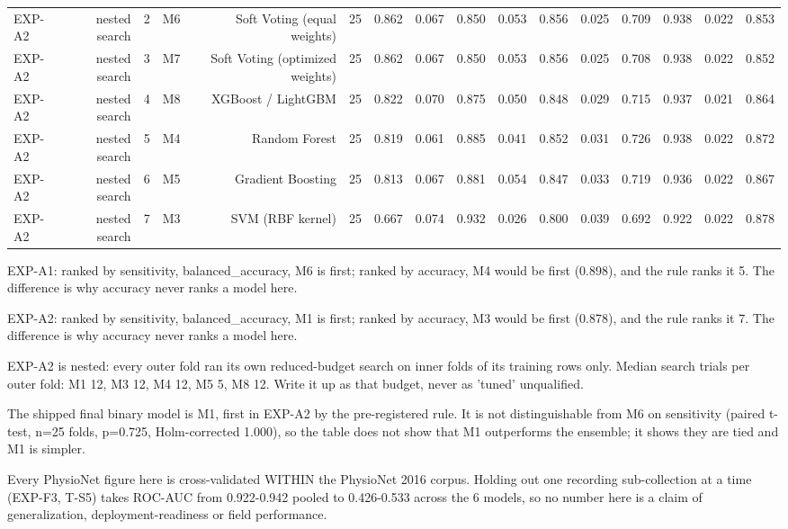 \begin{table}[htbp]
\begin{tabular}{lrrrrrrrrrrrrrrr}
    EXP-A2 & nested search & 2 & M6 & Soft Voting (equal weights) & 25 & 0.862 & 0.067 & 0.850 & 0.053 & 0.856 & 0.025 & 0.709 & 0.938 & 0.022 & 0.853 \\
    EXP-A2 & nested search & 3 & M7 & Soft Voting (optimized weights) & 25 & 0.862 & 0.067 & 0.850 & 0.053 & 0.856 & 0.025 & 0.708 & 0.938 & 0.022 & 0.852 \\
    EXP-A2 & nested search & 4 & M8 & XGBoost / LightGBM & 25 & 0.822 & 0.070 & 0.875 & 0.050 & 0.848 & 0.029 & 0.715 & 0.937 & 0.021 & 0.864 \\
    EXP-A2 & nested search & 5 & M4 & Random Forest & 25 & 0.819 & 0.061 & 0.885 & 0.041 & 0.852 & 0.031 & 0.726 & 0.938 & 0.022 & 0.872 \\
    EXP-A2 & nested search & 6 & M5 & Gradient Boosting & 25 & 0.813 & 0.067 & 0.881 & 0.054 & 0.847 & 0.033 & 0.719 & 0.936 & 0.022 & 0.867 \\
    EXP-A2 & nested search & 7 & M3 & SVM (RBF kernel) & 25 & 0.667 & 0.074 & 0.932 & 0.026 & 0.800 & 0.039 & 0.692 & 0.922 & 0.022 & 0.878 \\
    \bottomrule
  \end{tabular}
  \par\footnotesize EXP-A1: ranked by sensitivity, balanced\_accuracy, M6 is first; ranked by accuracy, M4 would be first (0.898), and the rule ranks it 5. The difference is why accuracy never ranks a model here.
  \par\footnotesize EXP-A2: ranked by sensitivity, balanced\_accuracy, M1 is first; ranked by accuracy, M3 would be first (0.878), and the rule ranks it 7. The difference is why accuracy never ranks a model here.
  \par\footnotesize EXP-A2 is nested: every outer fold ran its own reduced-budget search on inner folds of its training rows only. Median search trials per outer fold: M1 12, M3 12, M4 12, M5 5, M8 12. Write it up as that budget, never as 'tuned' unqualified.
  \par\footnotesize The shipped final binary model is M1, first in EXP-A2 by the pre-registered rule. It is not distinguishable from M6 on sensitivity (paired t-test, n=25 folds, p=0.725, Holm-corrected 1.000), so the table does not show that M1 outperforms the ensemble; it shows they are tied and M1 is simpler.
  \par\footnotesize Every PhysioNet figure here is cross-validated WITHIN the PhysioNet 2016 corpus. Holding out one recording sub-collection at a time (EXP-F3, T-S5) takes ROC-AUC from 0.922-0.942 pooled to 0.426-0.533 across the 6 models, so no number here is a claim of generalization, deployment-readiness or field performance.

\end{table}
